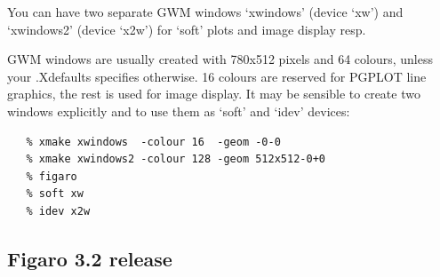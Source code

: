 \documentclass[11pt,twoside]{article}
\begin{document}
   You can have two separate GWM windows `xwindows' (device `xw') and
   `xwindows2' (device `x2w') for `soft' plots and image display resp.

   GWM windows are usually created with 780x512 pixels and 64 colours,
   unless your .Xdefaults specifies otherwise. 16 colours are reserved
   for PGPLOT line graphics, the rest is used for image display. It may
   be sensible to create two windows explicitly and to use them as
   `soft' and `idev' devices:

\begin{verbatim}
   % xmake xwindows  -colour 16  -geom -0-0
   % xmake xwindows2 -colour 128 -geom 512x512-0+0
   % figaro
   % soft xw
   % idev x2w
\end{verbatim}


\subsection{\label{news32}Figaro 3.2 release}

\end{document}

